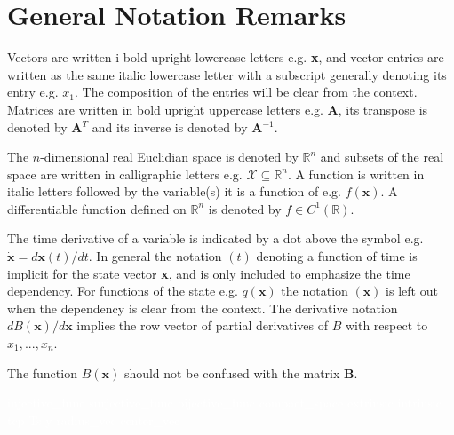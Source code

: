 \section*{General Notation Remarks}
\vspace{0.1cm}

Vectors are written i bold upright lowercase letters e.g. \textbf{x}, and vector entries are written as the same italic lowercase letter with a subscript generally denoting its entry e.g. $x_1$. The composition of the entries will be clear from the context.
Matrices are written in bold upright uppercase letters e.g. \textbf{A}, its transpose is denoted by \textbf{A}$^T$ and its inverse  is denoted by \textbf{A}$^{-1}$.

The $n$-dimensional real Euclidian space is denoted by $\mathbb{R}^n$ and subsets of the real space are written in calligraphic letters e.g. $\mathcal{X}\subseteq \mathbb{R}^n$. 
A function is written in italic letters followed by the variable(s) it is a function of e.g. $f(\mathbf{x})$. A differentiable function defined on $\mathbb{R}^n$ is denoted by $f\in C^1(\mathbb{R})$.

The time derivative of a variable is indicated by a dot above the symbol e.g. $\dot{\mathbf{x}} = d\mathbf{x}(t)/dt$. In general the notation $(t)$ denoting a function of time is implicit for the state vector \textbf{x}, and is only included to emphasize the time dependency. For functions of the state e.g. $q(\mathbf{x})$  the notation $(\mathbf{x})$ is left out when the dependency is clear from the context. The derivative notation $dB(\mathbf{x})/d\mathbf{x}$ implies the row vector of partial derivatives of $B$ with respect to $x_1,...,x_n$. 

The function $B(\mathbf{x})$ should not be confused with the matrix \textbf{B}.









\textcolor{white}{%
	\gls{injective_func} \gls{surjective_func} \gls{bijective_func}  \gls{compact_space}  \gls{extrinsic} \gls{intrinsic} \gls{tcp} \gls{Ts} \gls{y} \gls{radius_vec} \gls{center_vec}}